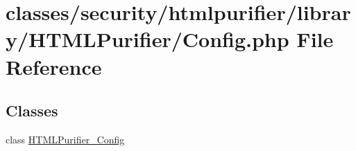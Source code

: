 \hypertarget{Config_8php}{\section{classes/security/htmlpurifier/library/\+H\+T\+M\+L\+Purifier/\+Config.php File Reference}
\label{Config_8php}
}
\subsection*{Classes}
\begin{DoxyCompactItemize}
\item 
class \hyperlink{classHTMLPurifier__Config}{H\+T\+M\+L\+Purifier\+\_\+\+Config}
\end{DoxyCompactItemize}
